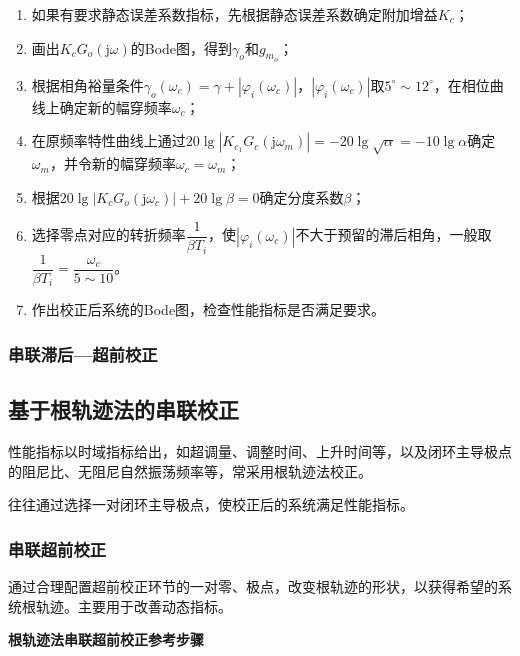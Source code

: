 \documentclass[cn, blue, normal, 12pt]{elegantnote}
\begin{document}
\begin{enumerate}
    \setlength{\itemsep}{6pt}
    \item 如果有要求静态误差系数指标，先根据静态误差系数确定附加增益$K_{c}$；
    \item 画出$K_{c}G_o(\mathrm{j}\omega)$的Bode图，得到$\gamma_o$和$g_{m_o}$；
    \item 根据相角裕量条件$\gamma_o(\omega_c)=\gamma+|\varphi_i(\omega_c)|$，$|\varphi_i(\omega_c)|$取$5^{\circ}\sim 12^{\circ}$，在相位曲线上确定新的幅穿频率$\omega_c$；
    \item 在原频率特性曲线上通过$20\lg{|K_{c_1}G_c(\mathrm{j}\omega_m)|}=-20\lg{\sqrt{\alpha}}=-10\lg{\alpha}$确定$\omega_m$，并令新的幅穿频率$\omega_c=\omega_m$；
    \item 根据$20\lg{|K_c G_o(\mathrm{j}\omega_c)|}+20\lg{\beta}=0$确定分度系数$\beta$；
    \item 选择零点对应的转折频率$\dfrac{1}{\beta T_i}$，使$|\varphi_i(\omega_c)|$不大于预留的滞后相角，一般取$\dfrac{1}{\beta T_i}=\dfrac{\omega_c}{5\sim 10}$。
    \item 作出校正后系统的Bode图，检查性能指标是否满足要求。
\end{enumerate}

\subsubsection{串联滞后—超前校正}



\subsection{基于根轨迹法的串联校正}

性能指标以时域指标给出，如超调量、调整时间、上升时间等，以及闭环主导极点的阻尼比、无阻尼自然振荡频率等，常采用根轨迹法校正。

往往通过选择一对闭环主导极点，使校正后的系统满足性能指标。

\subsubsection{串联超前校正}

通过合理配置超前校正环节的一对零、极点，改变根轨迹的形状，以获得希望的系统根轨迹。主要用于改善动态指标。

\textbf{根轨迹法串联超前校正参考步骤}
\end{document}
